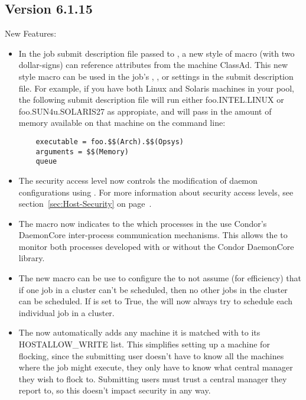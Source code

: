 \subsection{\label{sec:New-6-1-15}Version 6.1.15}

\noindent New Features:

\begin{itemize}

\item In the job submit description file passed to , 
a new style of macro (with two dollar-signs) can reference attributes
from the machine ClassAd.  This new style macro can be used in the
job's , , or 
settings in the submit description file.  For example, if you have both
Linux and Solaris machines in your pool, the following submit description
file will run either foo.INTEL.LINUX or foo.SUN4u.SOLARIS27 as appropiate,
and will pass in the amount of memory available on that machine on the
command line:
\begin{verbatim}
	executable = foo.$$(Arch).$$(Opsys)
	arguments = $$(Memory)
	queue
\end{verbatim}

\item The  security access level now controls the
modification of daemon configurations using .  For
more information about security access levels, see
section~\ref{sec:Host-Security} on
page~\pageref{sec:Host-Security}.

\item The  macro now indicates to the
 which processes in the  use
Condor's DaemonCore inter-process communication mechanisms.  This
allows the  to monitor both processes developed with or
without the Condor DaemonCore library.

\item The new  macro can be
use to configure the  to not assume (for efficiency)
that if one job in a cluster can't be scheduled, then no other jobs in
the cluster can be scheduled.
If  is set to True, the
 will now always try to schedule each individual job in
a cluster.

\item The  now automatically adds any machine it is
matched with to its HOSTALLOW\_WRITE list.
This simplifies setting up a machine for flocking, since the
submitting user doesn't have to know all the machines where the job
might execute, they only have to know what central manager they wish
to flock to.
Submitting users must trust a central manager they report to, so this
doesn't impact security in any way.


\end{itemize}
